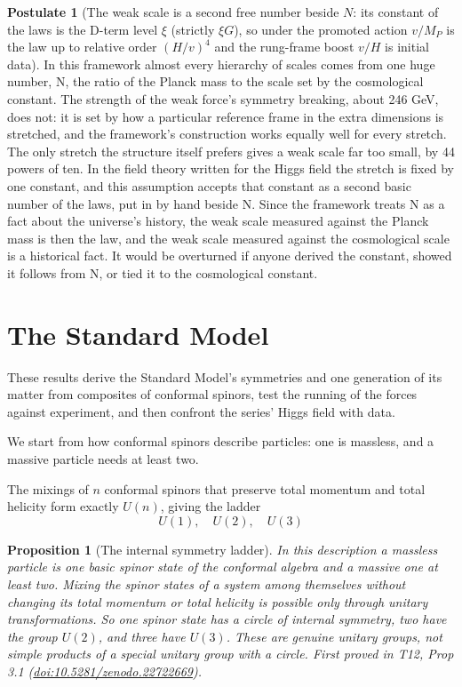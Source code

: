 \documentclass[11pt]{article}
\newtheorem{proposition}[theorem]{Proposition}
\theoremstyle{definition}
\newtheorem{postulate}[theorem]{Postulate}
\theoremstyle{plain}
\begin{document}
\begin{postulate}[The weak scale is a second free number beside $N$: its constant of the laws is the D-term level $\xi$ (strictly $\xi G$), so under the promoted action $v/M_{P}$ is the law up to relative order $(H/v)^{4}$ and the rung-frame boost $v/H$ is initial data]\label{c:synthesis.rung-unit-second-free-number}
In this framework almost every hierarchy of scales comes from one huge number, N, the ratio of the Planck mass to the scale set by the cosmological constant. The strength of the weak force's symmetry breaking, about 246 GeV, does not: it is set by how a particular reference frame in the extra dimensions is stretched, and the framework's construction works equally well for every stretch. The only stretch the structure itself prefers gives a weak scale far too small, by 44 powers of ten. In the field theory written for the Higgs field the stretch is fixed by one constant, and this assumption accepts that constant as a second basic number of the laws, put in by hand beside N. Since the framework treats N as a fact about the universe's history, the weak scale measured against the Planck mass is then the law, and the weak scale measured against the cosmological scale is a historical fact. It would be overturned if anyone derived the constant, showed it follows from N, or tied it to the cosmological constant.
\end{postulate}

\section{The Standard Model}

These results derive the Standard Model's symmetries and one generation of its matter from composites of conformal spinors, test the running of the forces against experiment, and then confront the series' Higgs field with data.

We start from how conformal spinors describe particles: one is massless, and a massive particle needs at least two.

The mixings of $n$ conformal spinors that preserve total momentum and total helicity form exactly $U(n)$, giving the ladder \[ U(1), \quad U(2), \quad U(3) \]

\begin{proposition}[The internal symmetry ladder]\label{c:standard-model.internal-symmetry-ladder}
In this description a massless particle is one basic spinor state of the conformal algebra and a massive one at least two. Mixing the spinor states of a system among themselves without changing its total momentum or total helicity is possible only through unitary transformations. So one spinor state has a circle of internal symmetry, two have the group $U(2)$, and three have $U(3)$. These are genuine unitary groups, not simple products of a special unitary group with a circle.
\emph{First proved in} T12, Prop 3.1 (\href{https://doi.org/10.5281/zenodo.22722669}{doi:10.5281/zenodo.22722669}).
\end{proposition}
\end{document}
